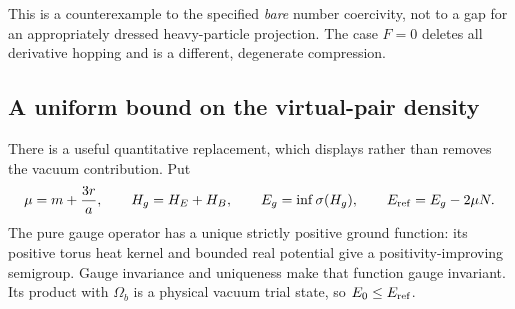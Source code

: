 This is a counterexample to the specified \emph{bare} number
coercivity, not to a gap for an appropriately dressed heavy-particle
projection. The case $F=0$ deletes all derivative hopping and is a
different, degenerate compression.

\subsection{A uniform bound on the virtual-pair density}

There is a useful quantitative replacement, which displays rather
than removes the vacuum contribution. Put
\[
 \mu=m+\frac{3r}{a},\qquad H_g=H_E+H_B,\qquad
 E_g=\inf\sigma(H_g),\qquad E_{\rm ref}=E_g-2\mu N .
\]
The pure gauge operator has a unique strictly positive ground
function: its positive torus heat kernel and bounded real potential
give a positivity-improving semigroup. Gauge invariance and uniqueness
make that function gauge invariant. Its product with $\Omega_b$ is
a physical vacuum trial state, so $E_0\le E_{\rm ref}$.

